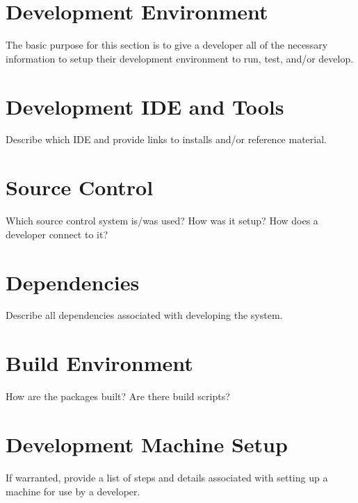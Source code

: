 \section{Development Environment}
The basic purpose for this section is to give a developer all of the necessary 
information to setup their development environment to run, test, and/or develop. 


\section{Development IDE and Tools}
Describe which IDE and provide links to installs and/or reference material. 

\section{Source  Control}
Which source control system is/was used?  How was it setup?  How does a developer 
connect to it? 

\section{Dependencies}
Describe all dependencies associated with developing the system. 

\section{Build  Environment}
How are the packages built?  Are there build scripts? 

\section{Development Machine Setup}
If warranted, provide a list of steps and details associated with setting up a 
machine for use by a developer. 


